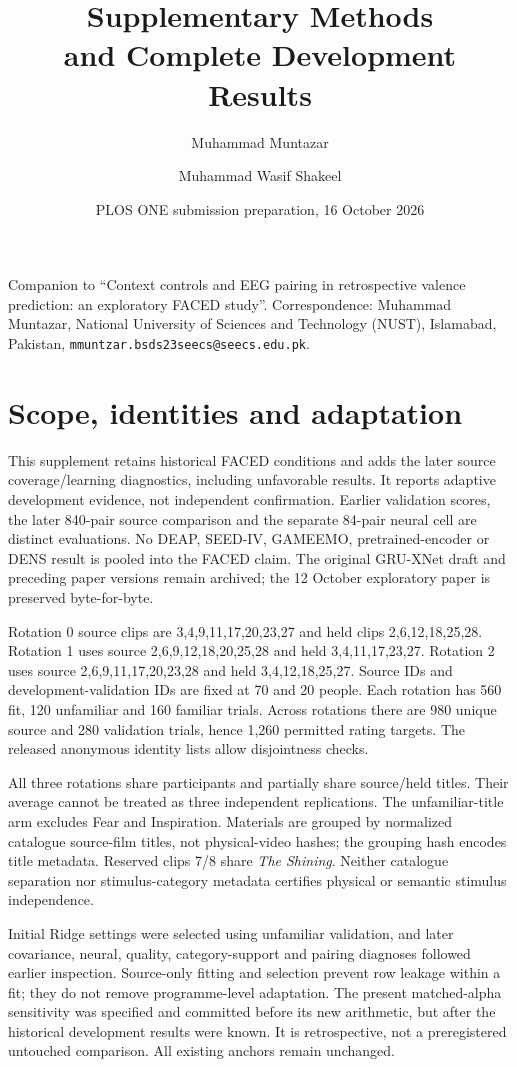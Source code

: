 \documentclass[10pt,a4paper]{article}
\title{Supplementary Methods\\and Complete Development Results}
\author{Muhammad Muntazar \and Muhammad Wasif Shakeel}
\date{PLOS ONE submission preparation, 16 October 2026}
\begin{document}
\maketitle
Companion to ``Context controls and EEG pairing in retrospective valence prediction: an exploratory FACED study''. Correspondence: Muhammad Muntazar, National University of Sciences and Technology (NUST), Islamabad, Pakistan, \nolinkurl{mmuntzar.bsds23seecs@seecs.edu.pk}.


\section{Scope, identities and adaptation}
This supplement retains historical FACED conditions and adds the later source coverage/learning diagnostics, including unfavorable results. It reports adaptive development evidence, not independent confirmation. Earlier validation scores, the later 840-pair source comparison and the separate 84-pair neural cell are distinct evaluations. No DEAP, SEED-IV, GAMEEMO, pretrained-encoder or DENS result is pooled into the FACED claim. The original GRU-XNet draft and preceding paper versions remain archived; the 12 October exploratory paper is preserved byte-for-byte.

Rotation 0 source clips are 3,4,9,11,17,20,23,27 and held clips 2,6,12,18,25,28. Rotation 1 uses source 2,6,9,12,18,20,25,28 and held 3,4,11,17,23,27. Rotation 2 uses source 2,6,9,11,17,20,23,28 and held 3,4,12,18,25,27. Source IDs and development-validation IDs are fixed at 70 and 20 people. Each rotation has 560 fit, 120 unfamiliar and 160 familiar trials. Across rotations there are 980 unique source and 280 validation trials, hence 1,260 permitted rating targets. The released anonymous identity lists allow disjointness checks.

All three rotations share participants and partially share source/held titles. Their average cannot be treated as three independent replications. The unfamiliar-title arm excludes Fear and Inspiration. Materials are grouped by normalized catalogue source-film titles, not physical-video hashes; the grouping hash encodes title metadata. Reserved clips 7/8 share \emph{The Shining}. Neither catalogue separation nor stimulus-category metadata certifies physical or semantic stimulus independence.

Initial Ridge settings were selected using unfamiliar validation, and later covariance, neural, quality, category-support and pairing diagnoses followed earlier inspection. Source-only fitting and selection prevent row leakage within a fit; they do not remove programme-level adaptation. The present matched-alpha sensitivity was specified and committed before its new arithmetic, but after the historical development results were known. It is retrospective, not a preregistered untouched comparison. All existing anchors remain unchanged.
\end{document}
